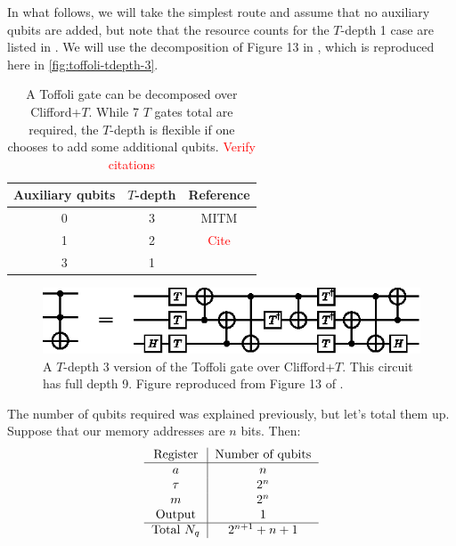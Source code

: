 \documentclass[a4paper,12pt]{article}
\newcommand\todo[1]{\textcolor{red}{#1}}
\begin{document}
In what follows, we will take the simplest route and assume that no auxiliary qubits are added, but note that the resource counts for the $T$-depth 1 case are listed in \cite{DiMatteo2020}. 
We will use the decomposition of Figure 13 in \cite{MITM}, which is reproduced here in \autoref{fig:toffoli-tdepth-3}.

\begin{table}
 \centering
  \captionsetup{width=.89\linewidth}
 \begin{tabular}{|c|c|c|}
  \hline
  Auxiliary qubits & $T$-depth & Reference \\ \hline
  0 & 3 & MITM \\ \hline
  1 & 2 & \todo{Cite} \\ \hline
  3 & 1 & \cite{Selinger2013} \\ \hline
 \end{tabular}
 \caption{A Toffoli gate can be decomposed over Clifford+$T$. 
 While 7 $T$ gates total are required, the $T$-depth is flexible if one chooses to add some additional qubits. \todo{Verify citations} }
 \label{tab:toffoli-tdepth}
\end{table}

\begin{figure}[h]
 \centering
 \captionsetup{width=.89\linewidth}
 \includegraphics[scale=1.5]{images/toffoli}
 \caption{A $T$-depth 3 version of the Toffoli gate over Clifford+$T$. 
 This circuit has full depth 9. 
 Figure reproduced from Figure 13 of \cite{MITM}.}
 \label{fig:toffoli-tdepth-3}
\end{figure}


The number of qubits required was explained previously, but let's total them up. 
Suppose that our memory addresses are $n$ bits. 
Then:
\begin{equation}
 \begin{tabular}{c|c}
  Register & Number  of qubits \\ \hline
  $a$ & $n$ \\
  $\tau$ & $2^n$ \\
  $m$ & $2^n$ \\
  Output & 1 \\ \hline
  Total $N_q$ & $2^{n+1} + n + 1$
 \end{tabular}
\end{equation} 
\end{document}
